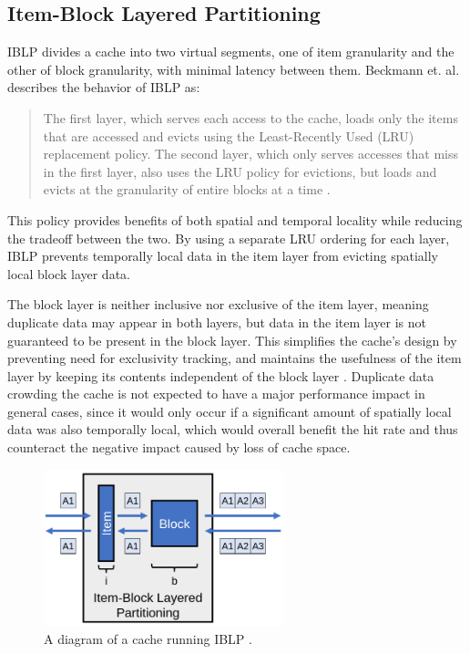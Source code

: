 \documentclass[12pt,twoside]{reedthesis}
\begin{document}
	\subsection*{Item-Block Layered Partitioning}

	IBLP divides a cache into two virtual segments, one of item granularity and the other of block granularity, with minimal latency between them. Beckmann et. al. describes the behavior of IBLP as: \begin{quote}
		The first layer, which serves each access to the cache, loads only the items that are accessed and evicts using the Least-Recently Used (LRU) replacement policy. The second layer, which only serves accesses that miss in the first layer, also uses the LRU policy for evictions, but loads and evicts at the granularity of entire blocks at a time \cite{beckmann}.
	\end{quote}

	This policy provides benefits of both spatial and temporal locality while reducing the tradeoff between the two. By using a separate LRU ordering for each layer, IBLP prevents temporally local data in the item layer from evicting spatially local block layer data.
	
	The block layer is neither inclusive nor exclusive of the item layer, meaning duplicate data may appear in both layers, but data in the item layer is not guaranteed to be present in the block layer. This simplifies the cache's design by preventing need for exclusivity tracking, and maintains the usefulness of the item layer by keeping its contents independent of the block layer \cite{beckmann}. Duplicate data crowding the cache is not expected to have a major performance impact in general cases, since it would only occur if a significant amount of spatially local data was also temporally local, which would overall benefit the hit rate and thus counteract the negative impact caused by loss of cache space.

	\begin{figure}[h]
		\centering
		\includegraphics[width=2.75in]{figures/IBLP.png}
		\caption{A diagram of a cache running IBLP \cite{beckmann}.}
	\end{figure}
\end{document}
